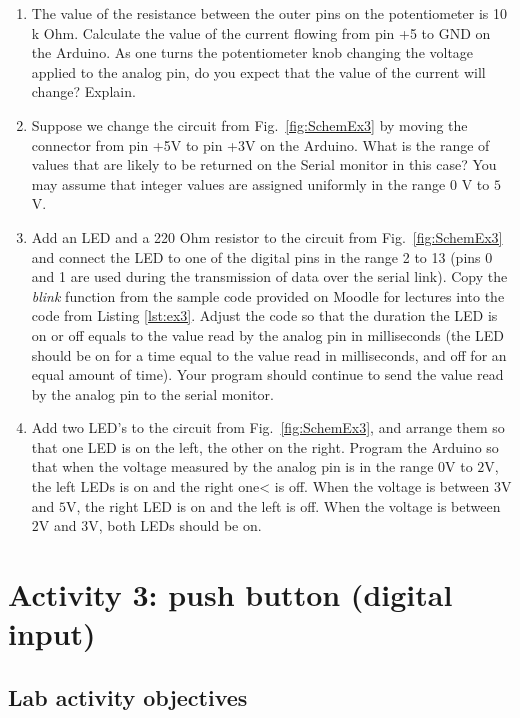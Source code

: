 \documentclass[12pt]{book}
\begin{document}
\begin{enumerate}[1.]
\item The value of the resistance between the outer pins on the
  potentiometer is 10 k Ohm. Calculate the value of the current
  flowing from pin +5 to GND on the Arduino. As one turns the
  potentiometer knob changing the voltage applied to the analog pin,
  do you expect that the value of the current will change? Explain.

\item Suppose we change the circuit from Fig.~\ref*{fig:SchemEx3} by
  moving the connector from pin +5V to pin +3V on the Arduino. What is
  the range of values that are likely to be returned on the Serial
  monitor in this case? You may assume that integer values are
  assigned uniformly in the range $0$ V to $5$ V.

\item\label{ex3:ch3} Add an LED and a 220 Ohm resistor to the circuit from
  Fig.~\ref*{fig:SchemEx3} and connect the LED to one of the digital
  pins in the range 2 to 13 (pins 0 and 1 are used during the
  transmission of data over the serial link). Copy the \emph{blink}
  function from the sample code provided on Moodle for lectures into
  the code from Listing \ref*{lst:ex3}. Adjust the code so that the
  duration the LED is on or off equals to the value read by the analog
  pin in milliseconds (the LED
  should be on for a time equal to the value read in milliseconds,
  and off for an equal amount of time). Your program should continue
  to send the value read by the analog pin to the serial monitor.

\item Add two LED's to the  circuit from
  Fig.~\ref*{fig:SchemEx3}, and arrange them so that one LED is on the
  left, the other on the right. Program the Arduino so that when the
  voltage measured by the analog pin is in the range $0$V to $2$V, the
  left LEDs is on and the right one< is off. When the voltage is between
  $3$V and $5$V, the right LED is on and the left is off. When the
  voltage is between $2$V and $3$V, both LEDs should be on.
\end{enumerate}



\chapter{Activity 3: push button (digital input)}\label{ch2.chap}

\section{Lab activity objectives}\label{se:obj2}
\end{document}
